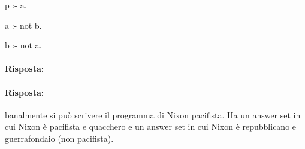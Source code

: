 
\begin{center}
  p :- a.

a :- not b.

b :- not a.
\end{center}



\paragraph{Risposta:}


\paragraph{Risposta:} banalmente si può scrivere il programma di Nixon pacifista. Ha un answer set in cui Nixon è pacifista e quacchero e un answer set in cui Nixon è repubblicano e guerrafondaio (non pacifista).

